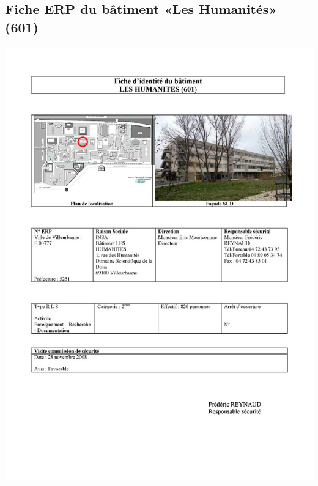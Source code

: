 \documentclass[hidelinks, paper=a4, fontsize=13pt]{report}
\begin{document}
\subsection{Fiche ERP du bâtiment «Les Humanités» (601)}
\begin{center}
\includegraphics[scale=0.5]{Annexes/Documents/ERPHumanites}
\end{center}
\end{document}
